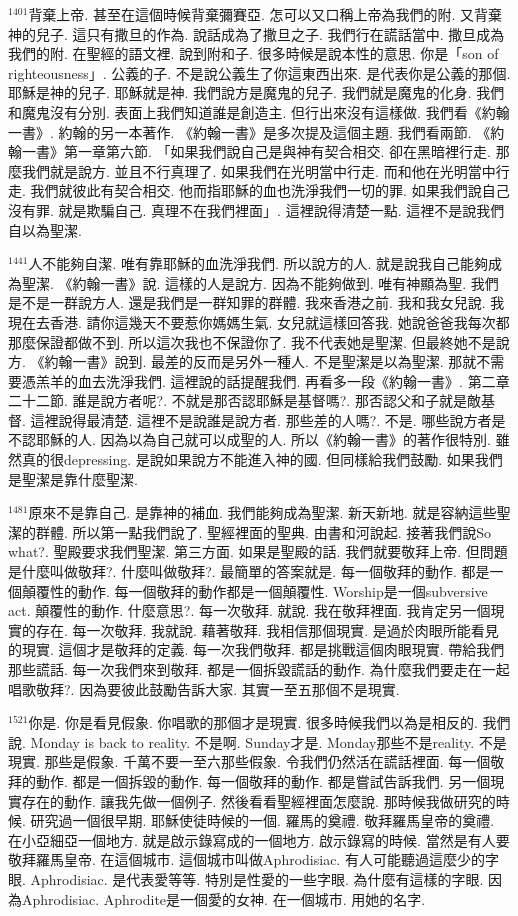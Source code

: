 \documentclass{book}
\begin{document}
$^{1401}$背棄上帝.
甚至在這個時候背棄彌賽亞.
怎可以又口稱上帝為我們的附.
又背棄神的兒子.
這只有撒旦的作為.
說話成為了撒旦之子.
我們行在謊話當中.
撒旦成為我們的附.
在聖經的語文裡.
說到附和子.
很多時候是說本性的意思.
你是「son of righteousness」.
公義的子.
不是說公義生了你這東西出來.
是代表你是公義的那個.
耶穌是神的兒子.
耶穌就是神.
我們說方是魔鬼的兒子.
我們就是魔鬼的化身.
我們和魔鬼沒有分別.
表面上我們知道誰是創造主.
但行出來沒有這樣做.
我們看《約翰一書》.
約翰的另一本著作.
《約翰一書》是多次提及這個主題.
我們看兩節.
《約翰一書》第一章第六節.
「如果我們說自己是與神有契合相交.
卻在黑暗裡行走.
那麼我們就是說方.
並且不行真理了.
如果我們在光明當中行走.
而和他在光明當中行走.
我們就彼此有契合相交.
他而指耶穌的血也洗淨我們一切的罪.
如果我們說自己沒有罪.
就是欺騙自己.
真理不在我們裡面」.
這裡說得清楚一點.
這裡不是說我們自以為聖潔.

$^{1441}$人不能夠自潔.
唯有靠耶穌的血洗淨我們.
所以說方的人.
就是說我自己能夠成為聖潔.
《約翰一書》說.
這樣的人是說方.
因為不能夠做到.
唯有神顯為聖.
我們是不是一群說方人.
還是我們是一群知罪的群體.
我來香港之前.
我和我女兒說.
我現在去香港.
請你這幾天不要惹你媽媽生氣.
女兒就這樣回答我.
她說爸爸我每次都那麼保證都做不到.
所以這次我也不保證你了.
我不代表她是聖潔.
但最終她不是說方.
《約翰一書》說到.
最差的反而是另外一種人.
不是聖潔是以為聖潔.
那就不需要憑羔羊的血去洗淨我們.
這裡說的話提醒我們.
再看多一段《約翰一書》.
第二章二十二節.
誰是說方者呢?.
不就是那否認耶穌是基督嗎?.
那否認父和子就是敵基督.
這裡說得最清楚.
這裡不是說誰是說方者.
那些差的人嗎?.
不是.
哪些說方者是不認耶穌的人.
因為以為自己就可以成聖的人.
所以《約翰一書》的著作很特別.
雖然真的很depressing.
是說如果說方不能進入神的國.
但同樣給我們鼓勵.
如果我們是聖潔是靠什麼聖潔.

$^{1481}$原來不是靠自己.
是靠神的補血.
我們能夠成為聖潔.
新天新地.
就是容納這些聖潔的群體.
所以第一點我們說了.
聖經裡面的聖典.
由書和河說起.
接著我們說So what?.
聖殿要求我們聖潔.
第三方面.
如果是聖殿的話.
我們就要敬拜上帝.
但問題是什麼叫做敬拜?.
什麼叫做敬拜?.
最簡單的答案就是.
每一個敬拜的動作.
都是一個顛覆性的動作.
每一個敬拜的動作都是一個顛覆性.
Worship是一個subversive act.
顛覆性的動作.
什麼意思?.
每一次敬拜.
就說.
我在敬拜裡面.
我肯定另一個現實的存在.
每一次敬拜.
我就說.
藉著敬拜.
我相信那個現實.
是過於肉眼所能看見的現實.
這個才是敬拜的定義.
每一次我們敬拜.
都是挑戰這個肉眼現實.
帶給我們那些謊話.
每一次我們來到敬拜.
都是一個拆毀謊話的動作.
為什麼我們要走在一起唱歌敬拜?.
因為要彼此鼓勵告訴大家.
其實一至五那個不是現實.

$^{1521}$你是.
你是看見假象.
你唱歌的那個才是現實.
很多時候我們以為是相反的.
我們說.
Monday is back to reality.
不是啊.
Sunday才是.
Monday那些不是reality.
不是現實.
那些是假象.
千萬不要一至六那些假象.
令我們仍然活在謊話裡面.
每一個敬拜的動作.
都是一個拆毀的動作.
每一個敬拜的動作.
都是嘗試告訴我們.
另一個現實存在的動作.
讓我先做一個例子.
然後看看聖經裡面怎麼說.
那時候我做研究的時候.
研究過一個很早期.
耶穌使徒時候的一個.
羅馬的奠禮.
敬拜羅馬皇帝的奠禮.
在小亞細亞一個地方.
就是啟示錄寫成的一個地方.
啟示錄寫的時候.
當然是有人要敬拜羅馬皇帝.
在這個城市.
這個城市叫做Aphrodisiac.
有人可能聽過這麼少的字眼.
Aphrodisiac.
是代表愛等等.
特別是性愛的一些字眼.
為什麼有這樣的字眼.
因為Aphrodisiac.
Aphrodite是一個愛的女神.
在一個城市.
用她的名字.
\end{document}
